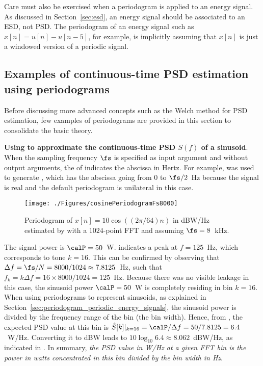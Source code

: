 Care must also be exercised when a periodogram is applied to an energy signal.
As discussed in Section~\ref{sec:esd}, an energy signal should be associated to an ESD, not PSD. The periodogram of an energy signal such as $x[n]=u[n]-u[n-5]$, for example, is implicitly assuming that $x[n]$ is just a windowed version of a periodic signal.

\subsection{Examples of continuous-time PSD estimation using periodograms}

Before discussing more advanced concepts such as the Welch method for PSD estimation, few examples of periodograms are provided in this section to consolidate the basic theory.

\bExample \textbf{Using  to approximate the continuous-time PSD $S(f)$ of a sinusoid}.
When the sampling frequency $\fs$ is specified as input argument and without output arguments, the  of {\matlab} indicates the abscissa in Hertz. For example,  was used to generate , which has the abscissa going from 0 to $\fs/2$~Hz because the signal is real and the default periodogram is unilateral in this case.


\begin{figure}[htbp]
\centering
\texttt{[image: ./Figures/cosinePeriodogramFs8000]}
\caption{Periodogram of $x[n]=10\cos((2\pi/64) n)$ in dBW/Hz estimated by  with a $1024$-point FFT and assuming $\fs=8$~kHz.\label{fig:cosinePeriodogramFs8000}}
\end{figure}


The signal power is $\calP = 50$~W.
 indicates a peak at $f=125$~Hz, which corresponds to tone $k=16$. This can be confirmed by observing that $\Delta f = \fs / N = 8000/1024 \approx 7.8125$~Hz, such that $f_k = k \Delta f = 16 \times 8000/1024 = 125$~Hz. 
Because there was no visible leakage in this case, the sinusoid power $\calP=50$~W 
is completely residing in bin $k=16$.
When using periodograms to represent sinusoids, as explained in Section~\ref{sec:periodogram_periodic_energy_signals}, the sinusoid power is divided by the frequency range of the bin (the bin width).
Hence, from , the expected PSD value at this bin is $\hat S[k]|_{k=16} = \calP / \Delta f = 50 / 7.8125 = 6.4$~W/Hz. Converting it to dBW leads to $10 \log_{10} 6.4 \approx 8.062$~dBW/Hz, as indicated in .
In summary, \emph{the PSD value in W/Hz at a given FFT bin is the power in watts concentrated in this bin divided by the bin width in Hz}.

